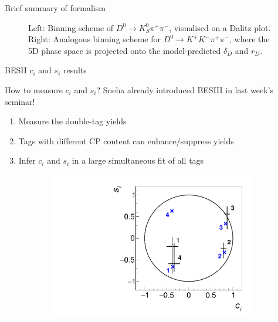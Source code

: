 \documentclass{beamer}
\begin{document}
\begin{frame}{Brief summary of formalism}
\begin{figure}
\begin{subfigure}{0.42\textwidth}
    \end{subfigure}
    \caption{Left: Binning scheme of $D^0\to K_S^0\pi^+\pi^-$, visualised on a Dalitz plot. Right: Analogous binning scheme for $D^0\to K^+K^-\pi^+\pi^-$, where the 5D phase space is projected onto the model-predicted $\delta_D$ and $r_D$.}
  \end{figure}
\end{frame}

\begin{frame}{BESII $c_i$ and $s_i$ results}
  \begin{center}
    \Large{How to measure $c_i$ and $s_i$? Sneha already introduced BESIII in last week's seminar!}
  \end{center}
  \begin{enumerate}
    \setlength\itemsep{1.0em}
    \item{Measure the double-tag yields}
    \item{Tags with different CP content can enhance/suppress yields}
    \item{Infer $c_i$ and $s_i$ in a large simultaneous fit of all tags}
  \end{enumerate}
  \begin{figure}
    \centering
    \begin{subfigure}{0.37\textwidth}
      \includegraphics[width = 1.0\textwidth]{Plots/cisi_FitResults_Model.pdf}
    \end{subfigure}%
    \hspace{1cm}
    \begin{subfigure}{0.30\textwidth}

\end{subfigure}
\end{figure}
\end{frame}
\end{document}

